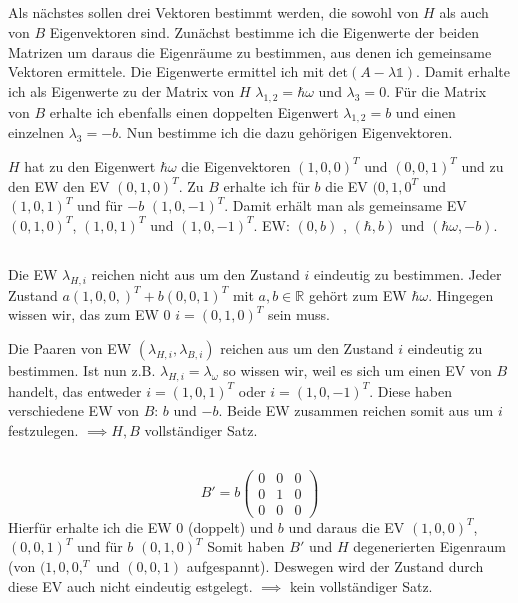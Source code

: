 \subsection{}
Als nächstes sollen drei Vektoren bestimmt werden, die sowohl von $H$ als auch von $B$ Eigenvektoren sind.
Zunächst bestimme ich die Eigenwerte der beiden Matrizen um daraus die Eigenräume zu bestimmen, aus denen ich gemeinsame Vektoren ermittele.
Die Eigenwerte ermittel ich mit $\text{det}(A-\lambda \mathbb{1})$. 
Damit erhalte ich als Eigenwerte zu der Matrix von $H$ $\lambda_{1,2}=\hbar\omega$ und $\lambda_3=0$.
Für die Matrix von $B$ erhalte ich ebenfalls einen doppelten Eigenwert $\lambda_{1,2}=b$ und einen einzelnen $\lambda_3=-b$.
Nun bestimme ich die dazu gehörigen Eigenvektoren.

$H$ hat zu den Eigenwert $\hbar\omega$ die Eigenvektoren $(1,0,0)^T$ und $(0,0,1)^T$ und zu den EW den EV $(0,1,0)^T$. Zu $B$ erhalte ich für $b$ die EV $(0,1,0^T$ und $(1,0,1)^T$ und für $-b$ $(1,0,-1)^T$.
Damit erhält man als gemeinsame EV $(0,1,0)^T$, $(1,0,1)^T$ und $(1,0,-1)^T$.
EW: $(0,b)$ , $(\hbar,b)$ und $(\hbar\omega,-b)$.

\subsection{}
Die EW $\lambda_{H,i}$ reichen nicht aus um den Zustand $i$ eindeutig zu bestimmen. Jeder Zustand $a(1,0,0,)^T+b(0,0,1)^T$ mit $a,b \in \mathbb R $ gehört zum EW $\hbar\omega$. Hingegen wissen wir, das zum EW $0$ $i=(0,1,0)^T$ sein muss.

Die Paaren von EW $(\lambda_{H,i},\lambda_{B,i})$ reichen aus um den Zustand $i$ eindeutig zu bestimmen. Ist nun z.B. $\lambda_{H,i} =\lambda_\omega$ so wissen wir, weil es sich um einen EV von $B$ handelt, das entweder $i=(1,0,1)^T$ oder $i=(1,0,-1)^T$. Diese haben verschiedene EW von $B$: $b$ und $-b$. Beide EW zusammen reichen somit aus um $i$festzulegen. $\implies {H,B}$ vollständiger Satz.

\subsection{}
\[
    B'=b\begin{pmatrix}
        0 &0 &0 \\
        0 &1 &0 \\
        0 &0 &0
    \end{pmatrix}
\]
Hierfür erhalte ich die EW $0$ (doppelt) und $b$ und daraus die EV $(1,0,0)^T$, $(0,0,1)^T$ und für $b$ $(0,1,0)^T$
Somit haben $B'$ und $H$ degenerierten Eigenraum (von $(1,0,0,^T$ und $(0,0,1)$ aufgespannt).
Deswegen wird der Zustand durch diese EV auch nicht eindeutig estgelegt. $\implies$ kein vollständiger Satz.

